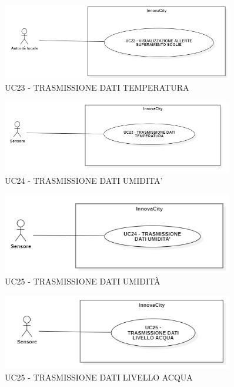 \begin{figure}[H]
    \centering
    \includegraphics[width=0.9\textwidth]{../Images/uc22.PNG}
    \caption{UC23 - TRASMISSIONE DATI TEMPERATURA}
\end{figure}

\begin{figure}[H]
    \centering
    \includegraphics[width=0.9\textwidth]{../Images/uc23.PNG}
    \caption{UC24 - TRASMISSIONE DATI UMIDITA'}
\end{figure}

\begin{figure}[H]
    \centering
    \includegraphics[width=0.9\textwidth]{../Images/uc24.PNG}
    \caption{UC25 - TRASMISSIONE DATI UMIDITÀ}
\end{figure}

\begin{figure}[H]
    \centering
    \includegraphics[width=0.9\textwidth]{../Images/uc25.PNG}
    \caption{UC25 - TRASMISSIONE DATI LIVELLO ACQUA}
\end{figure}
